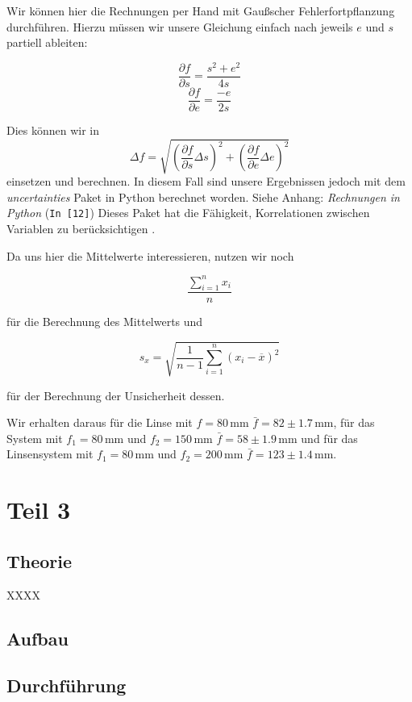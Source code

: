 \documentclass[11pt,a4paper]{article}
\newcommand{\refpy}[1]{Siehe Anhang: \textit{Rechnungen in Python} (\texttt{{\color{incolor}In [{\color{incolor}#1}]}})}
\newcommand{\halftime}[4]{\begin{figure}[h]
\begin{minipage}{.#1\textwidth}#3\end{minipage}\begin{minipage}{.#2\textwidth}
\centering
#4\end{minipage}
\end{figure}}
\newcommand\mean{\begin{equation}
\frac{\sum_{i=1}^n x_{i}}{n}\label{mean}
\end{equation}}
\newcommand\meanstd{\begin{equation}
s_x=\sqrt{\frac{1}{n-1}\sum_{i=1}^n(x_i-\overline{x})^2}\label{meanstd}
\end{equation}}
\begin{document}
Wir k\"onnen hier die Rechnungen per Hand mit Gau\ss scher Fehlerfortpflanzung durchf\"uhren. Hierzu m\"ussen wir unsere Gleichung einfach nach jeweils $e$ und $s$ partiell ableiten:

\[
\frac{\partial f}{\partial s}=\frac{s^2+e^2}{4s}
\]
\[
\frac{\partial f}{\partial e}=\frac{-e}{2s}
\]

Dies k\"onnen wir in
\[
\Delta f=\sqrt{\left(\frac{\partial f}{\partial s}\Delta s\right)^2+\left(\frac{\partial f}{\partial e}\Delta e\right)^2}
\]
einsetzen und berechnen. In diesem Fall sind unsere Ergebnissen jedoch mit dem \textit{uncertainties} Paket in Python berechnet worden. \refpy{12} Dieses Paket hat die F\"ahigkeit, Korrelationen zwischen Variablen zu ber\"ucksichtigen \cite{Uncertainties}.

Da uns hier die Mittelwerte interessieren, nutzen wir noch

\mean

f\"ur die Berechnung des Mittelwerts und

\meanstd

f\"ur der Berechnung der Unsicherheit dessen.

Wir erhalten daraus f\"ur die Linse mit $f=80\,$mm $\bar{f}=82\pm1.7\,$mm, f\"ur das System mit $f_1=80\,$mm und $f_2=150\,$mm $\bar{f}=58\pm1.9\,$mm und f\"ur das Linsensystem mit $f_1=80\,$mm und $f_2=200\,$mm $\bar{f}=123\pm1.4\,$mm.

\section{Teil 3}

\subsection{Theorie}

XXXX

\subsection{Aufbau}



\subsection{Durchführung}
\end{document}
